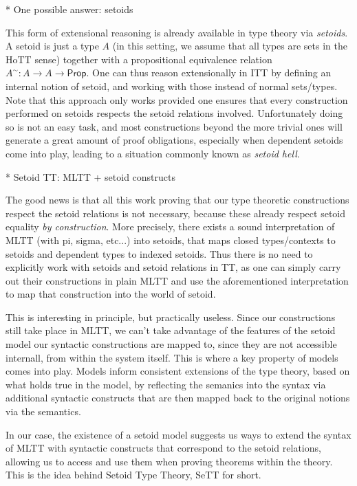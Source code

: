 \documentclass{easychair}
\newcommand{\Prop}{\textsf{Prop}}
\begin{document}
* One possible answer: setoids

This form of extensional reasoning is already available in type theory via
\emph{setoids}. A setoid is just a type $A$ (in this setting, we assume that all
types are sets in the HoTT sense) together with a propositional equivalence
relation $A^\sim : A \to A \to \Prop$.
%
One can thus reason extensionally in ITT by defining an internal notion of
setoid, and working with those instead of normal sets/types. Note that this
approach only works provided one ensures that every construction performed on
setoids respects the setoid relations involved. Unfortunately doing so is not an
easy task, and most constructions beyond the more trivial ones will generate a
great amount of proof obligations, especially when dependent setoids come into
play, leading to a situation commonly known as \emph{setoid hell}.

* Setoid TT: MLTT + setoid constructs

The good news is that all this work proving that our type theoretic
constructions respect the setoid relations is not necessary, because these
already respect setoid equality \emph{by construction}. More precisely, there
exists a sound interpretation of MLTT (with pi, sigma, etc...) into setoids,
that maps closed types/contexts to setoids and dependent types to indexed
setoids.
%
Thus there is no need to explicitly work with setoids and setoid relations in
TT, as one can simply carry out their constructions in plain MLTT and use the
aforementioned interpretation to map that construction into the world of setoid.

This is interesting in principle, but practically useless. Since our
constructions still take place in MLTT, we can't take advantage of the features
of the setoid model our syntactic constructions are mapped to, since they are
not accessible internall, from within the system itself.
%
This is where a key property of models comes into play. Models inform consistent
extensions of the type theory, based on what holds true in the model, by
reflecting the semanics into the syntax via additional syntactic constructs that
are then mapped back to the original notions via the semantics.

In our case, the existence of a setoid model suggests us ways to extend the
syntax of MLTT with syntactic constructs that correspond to the setoid
relations, allowing us to access and use them when proving theorems within the
theory.
%
This is the idea behind Setoid Type Theory, SeTT for short.
\end{document}
